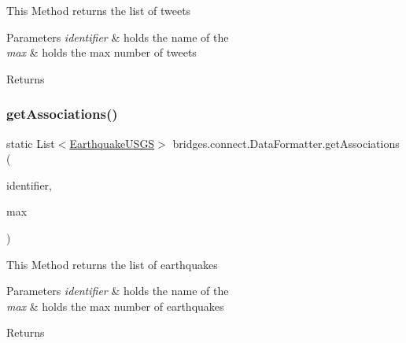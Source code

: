 This Method returns the list of tweets 
\begin{DoxyParams}{Parameters}
{\em identifier} & holds the name of the \\
\hline
{\em max} & holds the max number of tweets \\
\hline
\end{DoxyParams}
\begin{DoxyReturn}{Returns}

\end{DoxyReturn}
\mbox{\label{classbridges_1_1connect_1_1_data_formatter_abdcbc3c914dc045cb532fae291d4f3a5}} 
\subsubsection{\texorpdfstring{get\+Associations()}{getAssociations()}\hspace{0.1cm}{\footnotesize\ttfamily [3/5]}}
{\footnotesize\ttfamily static List$<$\hyperlink{classbridges_1_1data__src__dependent_1_1_earthquake_u_s_g_s}{Earthquake\+U\+S\+GS}$>$ bridges.\+connect.\+Data\+Formatter.\+get\+Associations (\begin{DoxyParamCaption}\item[{\hyperlink{classbridges_1_1data__src__dependent_1_1_u_s_g_saccount}{U\+S\+G\+Saccount}}]{identifier,  }\item[{int}]{max }\end{DoxyParamCaption})\hspace{0.3cm}{\ttfamily [static]}}

This Method returns the list of earthquakes 
\begin{DoxyParams}{Parameters}
{\em identifier} & holds the name of the \\
\hline
{\em max} & holds the max number of earthquakes \\
\hline
\end{DoxyParams}
\begin{DoxyReturn}{Returns}

\end{DoxyReturn}
\mbox{\label{classbridges_1_1connect_1_1_data_formatter_a5e9f400a020b99e0bbba1fd5332a8f88}} 
